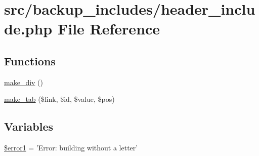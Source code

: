 \hypertarget{backup__includes_2header__include_8php}{\section{src/backup\-\_\-includes/header\-\_\-include.php \-File \-Reference}
\label{backup__includes_2header__include_8php}
}
\subsection*{\-Functions}
\begin{DoxyCompactItemize}
\item 
\hyperlink{backup__includes_2header__include_8php_a9b64f1f220cc9ae86966dea20839f84f}{make\-\_\-div} ()
\item 
\hyperlink{backup__includes_2header__include_8php_a10abcbcea4731eb8205dc4ab64940c16}{make\-\_\-tab} (\$link, \$id, \$value, \$pos)
\end{DoxyCompactItemize}
\subsection*{\-Variables}
\begin{DoxyCompactItemize}
\item 
\hyperlink{backup__includes_2header__include_8php_a048e701cb82acbcd5a5015d63db25858}{\$error1} = '\-Error\-: building without a letter'
\end{DoxyCompactItemize}


